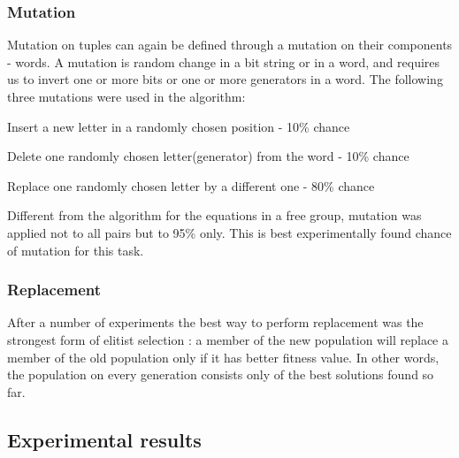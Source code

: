 \documentclass{article}
\begin{document}
    \subsubsection{Mutation}

Mutation on tuples can again be defined through a mutation on their
components - words. A mutation is random change in a bit string or in
a word, and requires us to invert one or more bits or one or more
generators in a word. The following three mutations were used in the
algorithm:

Insert a new letter in a randomly chosen position - 10\% chance
 
Delete one randomly chosen letter(generator) from the word -  10\% chance

Replace one randomly chosen letter by a different one -  80\% chance

\noindent
Different from the algorithm for the equations in a free group,
mutation was applied not to all pairs but to 95\% only. This is best
experimentally found chance of mutation for this task.


    \subsubsection{Replacement}

After a number of experiments the best way to perform replacement was
the strongest form of elitist selection \cite {Philips} : a member of the new
population will replace a member of the old population only if it has
better fitness value. In other words, the population on every
generation consists only of the best solutions found so far.

  \subsection{Experimental results}
\end{document}
